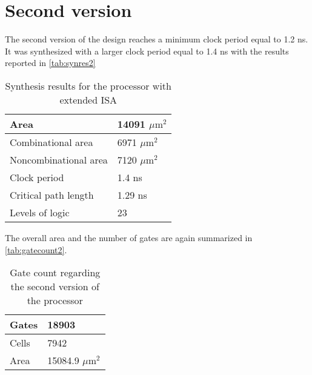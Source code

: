 \section{Second version}
The second version of the design reaches a minimum clock period equal to 1.2 ns. It was synthesized with a larger clock period equal to 1.4 ns with the results reported in \autoref{tab:synres2}
\begin{table}[h]
	\centering
	\begin{tabular}{|l|l|}
		\hline
		Area & 14091 $\mu\textrm{m}^2$\\\hline
		Combinational area &  6971 $\mu\textrm{m}^2$\\\hline
		Noncombinational area & 7120 $\mu\textrm{m}^2$\\\hline
		Clock period &  1.4 ns\\\hline
		Critical path length & 1.29 ns\\\hline
		Levels of logic & 23\\\hline
		
	\end{tabular}

	\caption{Synthesis results for the processor with extended ISA}
	\label{tab:synres2}
\end{table}
The overall area and the number of gates are again summarized in \autoref{tab:gatecount2}.
\begin{table}[h]
	\centering
	\begin{tabular}{|l|l|}\hline
		Gates &     18903\\\hline Cells &   7942\\\hline Area &   15084.9 $\mu\textrm{m}^2$\\\hline
	\end{tabular}
	\caption{Gate count regarding the second version of the processor}
	\label{tab:gatecount2}
\end{table}
